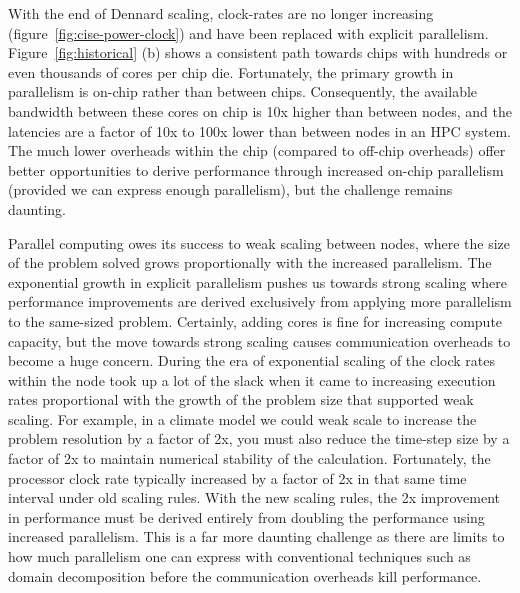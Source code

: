 With the end of Dennard scaling, clock-rates are no longer increasing (figure~\ref{fig:cise-power-clock}) and have been replaced with explicit parallelism.
Figure~\ref{fig:historical} (b) shows a consistent path towards chips with hundreds or even thousands of cores per chip die.  Fortunately, the primary growth in parallelism is on-chip rather than between chips.  Consequently, the available bandwidth between these cores on chip is 10x higher than between nodes, and the latencies are a factor of 10x to 100x lower than between nodes in an HPC system.  The much lower overheads within the chip (compared to off-chip overheads) offer better opportunities to derive performance through increased on-chip parallelism (provided we can express enough parallelism), but the challenge remains daunting.

Parallel computing owes its success to weak scaling between nodes, where the size of the problem solved grows proportionally with the increased parallelism.  The exponential growth in explicit parallelism pushes us towards strong scaling where performance improvements are derived exclusively from applying more parallelism to the same-sized problem.  Certainly, adding cores is fine for increasing compute capacity, but the move towards strong scaling causes communication overheads to become a huge concern.
During the era of exponential scaling of the clock rates within the node took up a lot of the slack when it came to increasing execution rates proportional with the growth of the problem size that supported weak scaling.  For example, in a climate model we could weak scale to increase the problem resolution by a factor of 2x, you must also reduce the time-step size by a factor of 2x to maintain numerical stability of the calculation.  Fortunately, the processor clock rate typically increased by a factor of 2x in that same time interval under old scaling rules.
With the new scaling rules, the 2x improvement in performance must be derived entirely from doubling the performance using increased parallelism.
This is a far more daunting challenge as there are limits to how much parallelism one can express with conventional techniques such as domain decomposition before the communication overheads kill performance.


